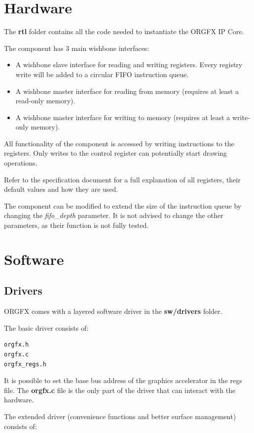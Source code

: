 \documentclass[10pt,a4paper]{article}
\begin{document}
\section{Hardware}
The \textbf{rtl} folder contains all the code needed to instantiate the ORGFX IP Core.

The component has 3 main wishbone interfaces:

\begin{itemize}
\item A wishbone slave interface for reading and writing registers. Every registry write will be added to a circular FIFO instruction queue.
\item A wishbone master interface for reading from memory (requires at least a read-only memory).
\item A wishbone master interface for writing to memory (requires at least a write-only memory).
\end{itemize}

All functionality of the component is accessed by writing instructions to the registers. Only writes to the control register can potentially start drawing operations.

Refer to the specification document for a full explanation of all registers, their default values and how they are used.

The component can be modified to extend the size of the instruction queue by changing the \textit{fifo\_depth} parameter. It is not advised to change the other parameters, as their function is not fully tested.

\section{Software}
\subsection{Drivers}
ORGFX comes with a layered software driver in the \textbf{sw/drivers} folder.

The basic driver consists of:

\begin{lstlisting}
orgfx.h
orgfx.c
orgfx_regs.h
\end{lstlisting}

It is possible to set the base bus address of the graphics accelerator in the regs file. The \textbf{orgfx.c} file is the only part of the driver that can interact with the hardware.

The extended driver (convenience functions and better surface management) consists of:
\end{document}
